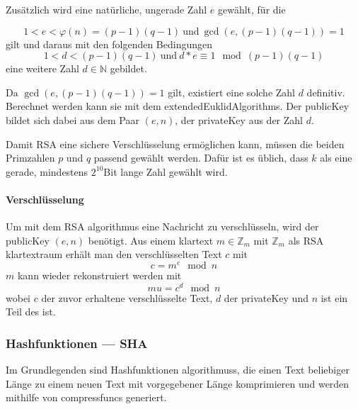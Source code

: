 Zusätzlich wird eine natürliche, ungerade Zahl $e$ gewählt, für die

\begin{equation}
    1 < e < \varphi(n) = (p - 1)(q - 1)\ \text{und}\ \gcd(e, (p-1)(q-1)) = 1\label{eq:equation2}
\end{equation}
gilt und daraus mit den folgenden Bedingungen
\begin{equation}
    1 < d < (p-1)(q-1)\ \text{und}\ d*e \equiv 1\mod(p-1)(q-1)\label{eq:equation3}
\end{equation}
eine weitere Zahl \(d \in \mathbb{N}\) gebildet.

Da $\gcd(e, (p-1)(q-1)) = 1$ gilt, existiert eine solche Zahl $d$ definitiv.
Berechnet werden kann sie mit dem \glspl{extendedEuklidAlgorithm}.
Der \gls{publicKey} bildet sich dabei aus dem Paar $(e, n)$, der \gls{privateKey} aus der Zahl $d$.\autocite[\pagef~169]{buchmann-einfuhrung-2016}

Damit \ac{RSA} eine sichere Verschlüsselung ermöglichen kann, müssen die beiden Primzahlen $p$ und $q$ passend gewählt werden.
Dafür ist es üblich, dass $k$ als eine gerade, mindestens $2^{10}$\nonbreakdash Bit lange Zahl gewählt wird.\autocite[\pagef~169]{buchmann-einfuhrung-2016}

\paragraph{Verschlüsselung}\label{par:verschluesselung}
Um mit dem \ac{RSA} \gls{algorithmus} eine Nachricht zu verschlüsseln, wird der \gls{publicKey} $(e, n)$ benötigt.
Aus einem \gls{klartext} \(m \in \mathbb{Z}_m\) mit \(\mathbb{Z}_m\) als \ac{RSA} \gls{klartextraum} erhält man den verschlüsselten Text $c$ mit
\begin{equation}
    c = m^e\mod n\label{eq:equation4}
\end{equation}
$m$ kann wieder rekonstruiert werden mit
\begin{equation}
    mu = c^d \mod n\label{eq:equation5}
\end{equation}
wobei $c$ der zuvor erhaltene verschlüsselte Text, $d$ der \gls{privateKey} und $n$ ist ein Teil des  ist.\autocite[\pagef~6]{rsa-encryption}

\subsubsection[Hashfunktionen]{Hashfunktionen — \acf{SHA}}\label{subsubsec:hash-funktion}
Im Grundlegenden sind Hashfunktionen \glspl{algorithmus}, die einen Text beliebiger Länge zu einem neuen Text mit vorgegebener Länge komprimieren\autocite[\pagef~15]{anal-des-hash-function-2003} und werden mithilfe von \sog \glspl{compressfunc} generiert.


